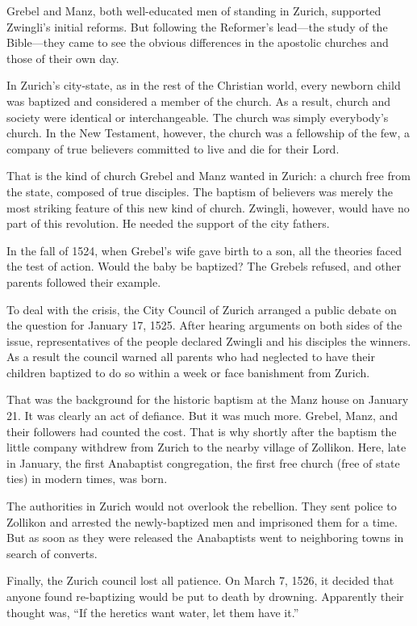 Grebel and Manz, both well-educated men of standing in Zurich, supported Zwingli’s initial reforms.
But following the Reformer’s lead—the study of the Bible—they came to see the obvious differences in
the apostolic churches and those of their own day.

In Zurich’s city-state, as in the rest of the Christian world, every newborn child was baptized and
considered a member of the church. As a result, church and society were identical or
interchangeable. The church was simply everybody’s church. In the New Testament, however, the church
was a fellowship of the few, a company of true believers committed to live and die for their Lord.

That is the kind of church Grebel and Manz wanted in Zurich: a church free from the state, composed
of true disciples. The baptism of believers was merely the most striking feature of this new kind of
church. Zwingli, however, would have no part of this revolution. He needed the support of the city
fathers.

In the fall of 1524, when Grebel’s wife gave birth to a son, all the theories faced the test of
action. Would the baby be baptized? The Grebels refused, and other parents followed their example.

To deal with the crisis, the City Council of Zurich arranged a public debate on the question for
January 17, 1525. After hearing arguments on both sides of the issue, representatives of the people
declared Zwingli and his disciples the winners. As a result the council warned all parents who had
neglected to have their children baptized to do so within a week or face banishment from Zurich.

That was the background for the historic baptism at the Manz house on January 21. It was clearly an
act of defiance. But it was much more. Grebel, Manz, and their followers had counted the cost. That
is why shortly after the baptism the little company withdrew from Zurich to the nearby village of
Zollikon. Here, late in January, the first Anabaptist congregation, the first free church (free of
state ties) in modern times, was born.

The authorities in Zurich would not overlook the rebellion. They sent police to Zollikon and
arrested the newly-baptized men and imprisoned them for a time. But as soon as they were released
the Anabaptists went to neighboring towns in search of converts.

Finally, the Zurich council lost all patience. On March 7, 1526, it decided that anyone found
re-baptizing would be put to death by drowning. Apparently their thought was, “If the heretics want
water, let them have it.”

